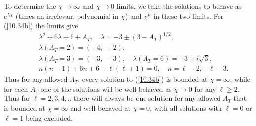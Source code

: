 To determine the $\chi \rightarrow \infty$ and $\chi \rightarrow 0$ limits, we take the solutions to behave as $e^{\lambda\chi}$ (times an irrelevant polynomial in $\chi$) and $\chi^n$ in these two limits. For (\ref{10.34b}) the limits give
%
\begin{eqnarray}
&&\lambda^2+6\lambda+6+A_T,\quad \lambda=-3\pm(3-A_T)^{1/2},
\nonumber\\
&&\lambda(A_T=2)=(-4,~-2),
\nonumber\\
&& \lambda(A_T=3)=(-3,~-3),\quad \lambda(A_T=6)=-3\pm i\surd{3},
\nonumber\\
&&n(n-1)+6n+6-\ell(\ell+1)=0,\quad n=\ell-2, -\ell-3.
\label{10.35b}
\end{eqnarray}
%
Thus for any allowed $A_T$, every solution to (\ref{10.34b}) is bounded at $\chi=\infty$, while for each $A_T$ one of the solutions will be well-behaved as $\chi\rightarrow 0$ for any $\ell\geq 2$.  Thus for $\ell=2,3,4,..$  there will always be one solution for any allowed $A_T$ that is bounded at $\chi=\infty$ and well-behaved at $\chi=0$, with all solutions with $\ell=0$ or $\ell=1$ being excluded.

